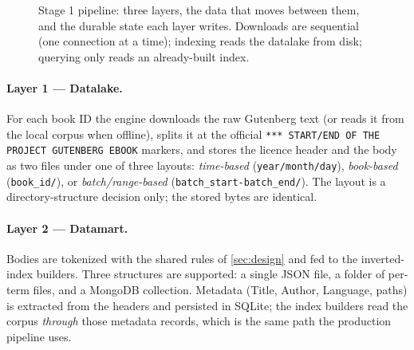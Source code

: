 \begin{figure}[htbp]
    \caption{Stage 1 pipeline: three layers, the data that moves between them,
    and the durable state each layer writes. Downloads are sequential (one
    connection at a time); indexing reads the datalake from disk; querying
    only reads an already-built index.}
    \label{fig:pipeline}
\end{figure}

\paragraph{Layer 1 --- Datalake.}
For each book ID the engine downloads the raw Gutenberg text (or reads it
from the local corpus when offline), splits it at the official
\texttt{*** START/END OF THE PROJECT GUTENBERG EBOOK} markers, and stores the
licence header and the body as two files under one of three layouts:
\emph{time-based} (\texttt{year/month/day}), \emph{book-based}
(\texttt{book\_id/}), or \emph{batch/range-based}
(\texttt{batch\_start-batch\_end/}). The layout is a directory-structure
decision only; the stored bytes are identical.

\paragraph{Layer 2 --- Datamart.}
Bodies are tokenized with the shared rules of \cref{sec:design} and fed to
the inverted-index builders. Three structures are supported: a single JSON
file, a folder of per-term files, and a MongoDB collection. Metadata
(Title, Author, Language, paths) is extracted from the headers and persisted
in SQLite; the index builders read the corpus \emph{through} those metadata
records, which is the same path the production pipeline uses.

